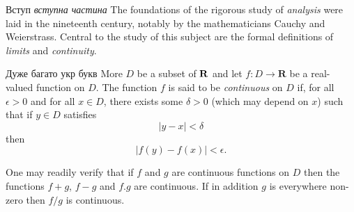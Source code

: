 \documentclass[a4paper,12pt]{article}
\begin{document}
Вступ \emph{вступна частина}
The foundations of the rigorous study of \emph{analysis} were laid in the nineteenth century, notably by the mathematicians Cauchy and Weierstrass. Central to the study of this subject are the formal definitions of \emph{limits} and \emph{continuity}.

Дуже багато укр букв
More $D$ be a subset of $\bf R$ and let
$f \colon D \to \mathbf{R}$ be a real-valued function on
$D$. The function $f$ is said to be \emph{continuous} on
$D$ if, for all $\epsilon > 0$ and for all $x \in D$,
there exists some $\delta >0$ (which may depend on $x$)
such that if $y \in D$ satisfies
\[ |y - x| < \delta \]
then
\[ |f(y) - f(x)| < \epsilon. \]

One may readily verify that if $f$ and $g$ are continuous
functions on $D$ then the functions $f+g$, $f-g$ and
$f.g$ are continuous. If in addition $g$ is everywhere
non-zero then $f/g$ is continuous.
\end{document}
